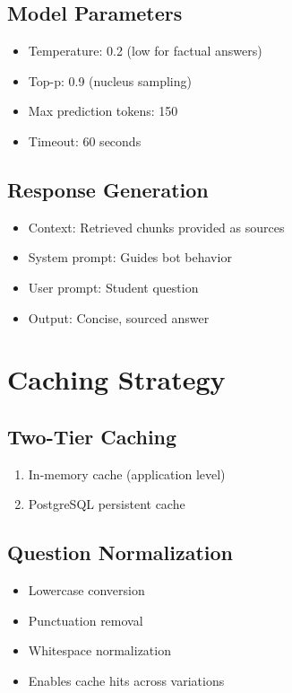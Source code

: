 \documentclass[12pt]{article}
\begin{document}
\subsection{Model Parameters}

\begin{itemize}
    \item Temperature: 0.2 (low for factual answers)
    \item Top-p: 0.9 (nucleus sampling)
    \item Max prediction tokens: 150
    \item Timeout: 60 seconds
\end{itemize}

\subsection{Response Generation}

\begin{itemize}
    \item Context: Retrieved chunks provided as sources
    \item System prompt: Guides bot behavior
    \item User prompt: Student question
    \item Output: Concise, sourced answer
\end{itemize}

\section{Caching Strategy}

\subsection{Two-Tier Caching}

\begin{enumerate}
    \item In-memory cache (application level)
    \item PostgreSQL persistent cache
\end{enumerate}

\subsection{Question Normalization}

\begin{itemize}
    \item Lowercase conversion
    \item Punctuation removal
    \item Whitespace normalization
    \item Enables cache hits across variations
\end{itemize}
\end{document}

